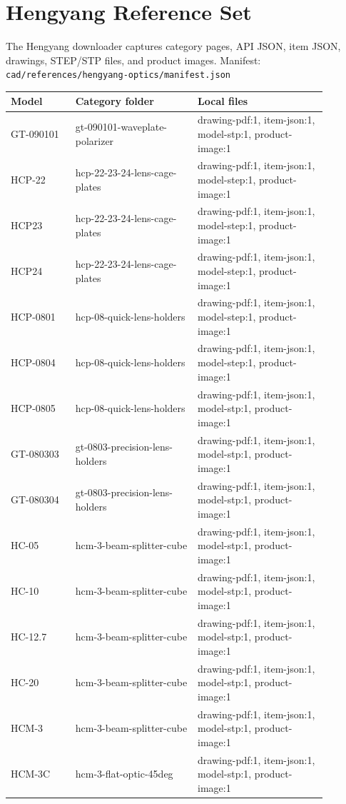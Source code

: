 \documentclass[10pt]{article}
\begin{document}
\section{Hengyang Reference Set}
The Hengyang downloader captures category pages, API JSON, item JSON, drawings, STEP/STP files, and product images.
Manifest: \texttt{cad/references/hengyang-optics/manifest.json}
\begin{longtable}{p{0.18\linewidth}p{0.34\linewidth}p{0.36\linewidth}}
\textbf{Model} & \textbf{Category folder} & \textbf{Local files} \\ \hline
GT-090101 & gt-090101-waveplate-polarizer & drawing-pdf:1, item-json:1, model-stp:1, product-image:1 \\
HCP-22 & hcp-22-23-24-lens-cage-plates & drawing-pdf:1, item-json:1, model-step:1, product-image:1 \\
HCP23 & hcp-22-23-24-lens-cage-plates & drawing-pdf:1, item-json:1, model-step:1, product-image:1 \\
HCP24 & hcp-22-23-24-lens-cage-plates & drawing-pdf:1, item-json:1, model-step:1, product-image:1 \\
HCP-0801 & hcp-08-quick-lens-holders & drawing-pdf:1, item-json:1, model-step:1, product-image:1 \\
HCP-0804 & hcp-08-quick-lens-holders & drawing-pdf:1, item-json:1, model-step:1, product-image:1 \\
HCP-0805 & hcp-08-quick-lens-holders & drawing-pdf:1, item-json:1, model-stp:1, product-image:1 \\
GT-080303 & gt-0803-precision-lens-holders & drawing-pdf:1, item-json:1, model-stp:1, product-image:1 \\
GT-080304 & gt-0803-precision-lens-holders & drawing-pdf:1, item-json:1, model-stp:1, product-image:1 \\
HC-05 & hcm-3-beam-splitter-cube & drawing-pdf:1, item-json:1, model-stp:1, product-image:1 \\
HC-10 & hcm-3-beam-splitter-cube & drawing-pdf:1, item-json:1, model-stp:1, product-image:1 \\
HC-12.7 & hcm-3-beam-splitter-cube & drawing-pdf:1, item-json:1, model-stp:1, product-image:1 \\
HC-20 & hcm-3-beam-splitter-cube & drawing-pdf:1, item-json:1, model-stp:1, product-image:1 \\
HCM-3 & hcm-3-beam-splitter-cube & drawing-pdf:1, item-json:1, model-stp:1, product-image:1 \\
HCM-3C & hcm-3-flat-optic-45deg & drawing-pdf:1, item-json:1, model-stp:1, product-image:1 \\

\end{longtable}
\end{document}
